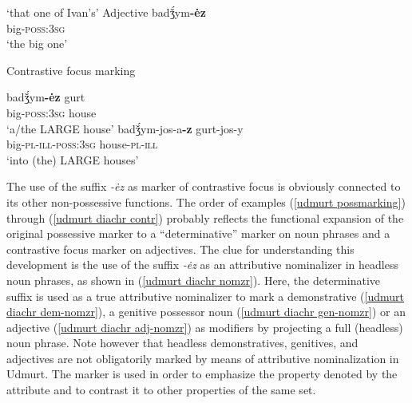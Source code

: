 \begin{exe}
\begin{xlist}
\begin{xlist}
	 ‘that one of Ivan's’
\ex 	Adjective \label{udmurt diachr adj-nomzr}
\gll	badǯ́ym\textbf{-ėz}\\
	big-\textsc{poss:3sg}\\
	 ‘the big one’
\end{xlist}
\ex Contrastive focus marking \label{udmurt diachr contr}
\begin{xlist}
\ex	
\gll	badǯ́ym\textbf{-ėz} gurt\\
	big-\textsc{poss:3sg} house\\
\glt	‘a/the LARGE house’
\ex	
\gll	badǯ́ym-jos-a\textbf{-z} gurt-jos-y\\
	big-\textsc{pl}-\textsc{ill}-\textsc{poss:3sg} house-\textsc{pl}-\textsc{ill}\\
	‘into (the) LARGE houses’
\end{xlist}
\end{xlist}
\end{exe}
The use of the suffix \textit{-ėz} as marker of contrastive focus is obviously connected to its other non-possessive functions. The order of examples (\ref{udmurt possmarking}) through (\ref{udmurt diachr contr}) probably reflects the functional expansion of the original possessive marker to a “determinative” marker on noun phrases and a contrastive focus marker on adjectives. The clue for understanding this development is the use of the suffix \textit{-ėz} as an attributive nominalizer in headless noun phrases, as shown in (\ref{udmurt diachr nomzr}). Here, the determinative suffix is used as a true attributive nominalizer to mark a demonstrative (\ref{udmurt diachr dem-nomzr}), a genitive possessor noun (\ref{udmurt diachr gen-nomzr}) or an adjective (\ref{udmurt diachr adj-nomzr}) as modifiers by projecting a full (headless) noun phrase. Note however that headless demonstratives, genitives, and adjectives are not obligatorily marked by means of attributive nominalization in Udmurt. The marker is used in order to emphasize the property denoted by the attribute and to contrast it to other properties of the same set.

